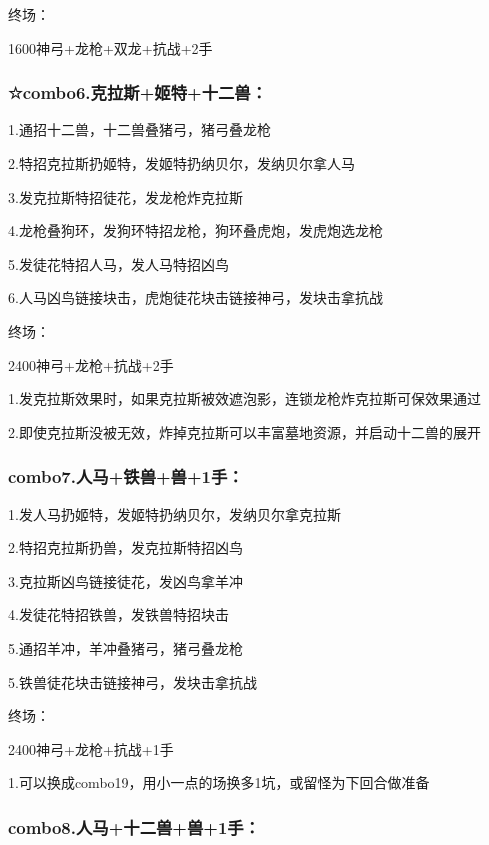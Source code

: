 \documentclass[
]{article}
\begin{document}
终场：

1600神弓+龙枪+双龙+抗战+2手

\hypertarget{combo6.ux514bux62c9ux65afux59ecux7279ux5341ux4e8cux517d}{%
\subsubsection{☆combo6.克拉斯+姬特+十二兽：}\label{combo6.ux514bux62c9ux65afux59ecux7279ux5341ux4e8cux517d}}

1.通招十二兽，十二兽叠猪弓，猪弓叠龙枪

2.特招克拉斯扔姬特，发姬特扔纳贝尔，发纳贝尔拿人马

3.发克拉斯特招徒花，发龙枪炸克拉斯

4.龙枪叠狗环，发狗环特招龙枪，狗环叠虎炮，发虎炮选龙枪

5.发徒花特招人马，发人马特招凶鸟

6.人马凶鸟链接块击，虎炮徒花块击链接神弓，发块击拿抗战

终场：

2400神弓+龙枪+抗战+2手

1.发克拉斯效果时，如果克拉斯被效遮泡影，连锁龙枪炸克拉斯可保效果通过

2.即使克拉斯没被无效，炸掉克拉斯可以丰富墓地资源，并启动十二兽的展开

\hypertarget{combo7.ux4ebaux9a6cux94c1ux517dux517d1ux624b}{%
\subsubsection{combo7.人马+铁兽+兽+1手：}\label{combo7.ux4ebaux9a6cux94c1ux517dux517d1ux624b}}

1.发人马扔姬特，发姬特扔纳贝尔，发纳贝尔拿克拉斯

2.特招克拉斯扔兽，发克拉斯特招凶鸟

3.克拉斯凶鸟链接徒花，发凶鸟拿羊冲

4.发徒花特招铁兽，发铁兽特招块击

5.通招羊冲，羊冲叠猪弓，猪弓叠龙枪

5.铁兽徒花块击链接神弓，发块击拿抗战

终场：

2400神弓+龙枪+抗战+1手

1.可以换成combo19，用小一点的场换多1坑，或留怪为下回合做准备

\hypertarget{combo8.ux4ebaux9a6cux5341ux4e8cux517dux517d1ux624b}{%
\subsubsection{combo8.人马+十二兽+兽+1手：}\label{combo8.ux4ebaux9a6cux5341ux4e8cux517dux517d1ux624b}}
\end{document}

